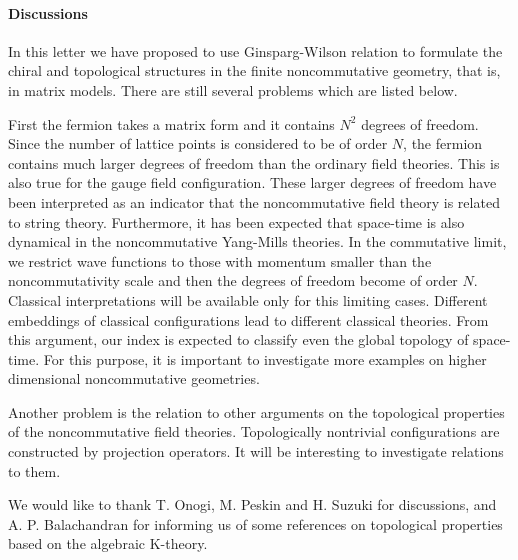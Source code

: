\documentclass[a4paper,prl,showpacs,twocolumn]{revtex4}
\begin{document}
\paragraph{{\bf Discussions}}
In this letter we have proposed to use Ginsparg-Wilson 
relation to formulate the chiral and topological structures
in the finite noncommutative geometry, that is, in 
matrix models.
There are still several problems which are listed below.
\par
First the fermion takes a matrix form
and  it contains $N^2$ degrees of freedom.
Since the number of lattice points is
considered to be of order $N$, the fermion contains
much larger degrees of freedom than the ordinary field theories.
This is also true for the gauge field configuration.
These larger degrees of freedom have been interpreted 
as an indicator that the noncommutative field theory is 
related to string theory\cite{NCYM}. Furthermore, it has been
expected that space-time is also dynamical in the
noncommutative Yang-Mills theories.
In the commutative limit, 
we restrict wave functions to those with momentum smaller than
the noncommutativity scale and then the degrees of freedom
become of order $N$. 
Classical interpretations will be available only for this 
limiting cases.
Different embeddings of classical configurations
lead to different classical theories.
From this argument, our index is expected to classify 
even the global topology of space-time.
For this purpose,
it is important to investigate more examples on higher
dimensional noncommutative geometries.
\par
Another problem is the relation to  other arguments
on the topological properties of the noncommutative field 
theories\cite{Connes,harvey,balatop}. 
Topologically nontrivial configurations are constructed 
by projection operators. 
It will be interesting to investigate relations to them.
\par
We would like to thank T. Onogi, M. Peskin and H. Suzuki 
for discussions, and A. P. Balachandran for informing us 
of some references on topological properties based on the 
algebraic K-theory.
\end{document}

